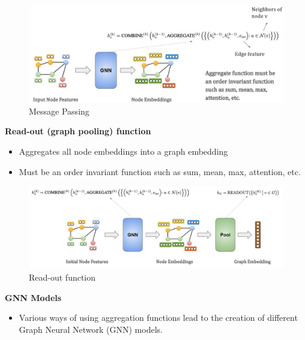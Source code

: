 \begin{figure}[h!t]
    \centering
    \includegraphics[width=0.75\linewidth]{messagepassingf.png}
    \caption{Message Passing}
    \label{fig:enter-label}
\end{figure}
\newpage

\textbf{Read-out (graph pooling) function}\\
\begin{itemize}
    \item Aggregates all node embeddings into a graph embedding
    \item Must be an order invariant function such as sum, mean, max, attention, etc.
\end{itemize}

\begin{figure}[h!t]
    \centering
    \includegraphics[width=1\linewidth]{Graphpooling.png}
    \caption{Read-out function}
    \label{fig:enter-label}
\end{figure}

\textbf{GNN Models}\\
\begin{itemize}
    \item Various ways of using aggregation functions lead to the creation of different Graph Neural Network (GNN) models.
\end{itemize}

